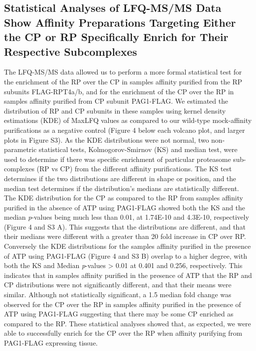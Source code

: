 \subsection{Statistical Analyses of LFQ-MS/MS Data Show Affinity Preparations Targeting Either the CP or RP Specifically Enrich for Their Respective Subcomplexes}
The LFQ-MS/MS data allowed us to perform a more formal statistical test for the enrichment of the RP over the CP in samples affinity purified from the RP subunits FLAG-RPT4a/b, and for the enrichment of the CP over the RP in samples affinity purified from CP subunit PAG1-FLAG. We estimated the distribution of RP and CP subunits in these samples using kernel density estimations (KDE) of MaxLFQ values as compared to our wild-type mock-affinity purifications as a negative control (Figure 4 below each volcano plot, and larger plots in Figure S3).  As the KDE distributions were not normal, two non-parametric statistical tests, Kolmogorov-Smirnov (KS) and median test, were used to determine if there was specific enrichment of particular proteasome sub-complexes (RP vs CP) from the different affinity purifications. The KS test determines if the two distributions are different in shape or position, and the median test determines if the distribution’s medians are statistically different.
The KDE distribution for the CP as compared to the RP from samples affinity purified in the absence of ATP using PAG1-FLAG showed both the KS and the median \textit{p}-values being much less than 0.01, at 1.74E-10 and 4.3E-10, respectively (Figure 4 and S3 A). This suggests that the distributions are different, and that their medians were different with a greater than 20 fold increase in CP over RP. Conversely the KDE distributions for the samples affinity purified in the presence of ATP using PAG1-FLAG (Figure 4 and S3 B) overlap to a higher degree, with both the KS and Median \textit{p}-values > 0.01 at 0.401 and 0.256, respectively. This indicates that in samples affinity purified in the presence of ATP that the RP and CP distributions were not significantly different, and that their means were similar. Although not statistically significant, a 1.5 median fold change was observed for the CP over the RP in samples affinity purified in the presence of ATP using PAG1-FLAG suggesting that there may be some CP enriched as compared to the RP. These statistical analyses showed that, as expected, we were able to successfully enrich for the CP over the RP when affinity purifying from PAG1-FLAG expressing tissue.
